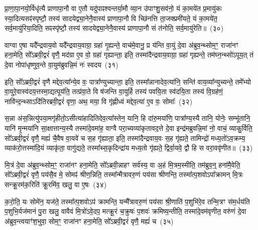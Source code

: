 प्रा॒णा॒पा॒नयो॒र्विधृ॑त्यै प्राणापा॒नौ वा ए॒तौ यदु॑पाꣴश्वन्तर्या॒मौ व्या॒न उ॑पाꣳशु॒सव॑नो॒ यं का॒मये॑त प्र॒मायु॑कः स्या॒दित्यसꣴ॑स्पृष्टौ॒ तस्य॑ सादयेद्व्या॒नेनै॒वास्य॑ प्राणापा॒नौ वि च्छि॑नत्ति ता॒जक्प्रमी॑यते॒ यं का॒मये॑त॒ सर्व॒मायु॑रिया॒दिति॒ सꣴस्पृ॑ष्टौ॒ तस्य॑ सादयेद्व्या॒नेनै॒वास्य॑ प्राणापा॒नौ सं त॑नोति॒ सर्व॒मायु॑रेति॥~(३०)

{\anuvakamend[{त॒ उ॒भया᳚न्गृह्यते॒ चतु॑श्चत्वारिꣳशच्च}]}%

वाग्वा ए॒षा यदै᳚न्द्रवाय॒वो यदै᳚न्द्रवाय॒वाग्रा॒ ग्रहा॑ गृ॒ह्यन्ते॒ वाच॑मे॒वानु॒ प्र य॑न्ति वा॒युं दे॒वा अ॑ब्रुव॒न्थ्सोम॒ꣳ॒ राजा॑नꣳ हना॒मेति॒ सो᳚\-ऽब्रवी॒द्वरं॑ वृणै॒ मद॑ग्रा ए॒व वो॒ ग्रहा॑ गृह्यान्ता॒ इति॒ तस्मा॑दैन्द्रवाय॒वाग्रा॒ ग्रहा॑ गृह्यन्ते॒ तम॑घ्न॒न्थ्सो॑\-ऽपूय॒त् तं दे॒वा नोपा॑धृष्णुव॒न्ते वा॒युम॑ब्रुवन्नि॒मं नः॑ स्वदय~(३१)

इति॒ सो᳚\-ऽब्रवी॒द्वरं॑ वृणै मद्देव॒त्या᳚न्ये॒व वः॒ पात्रा᳚ण्युच्यान्ता॒ इति॒ तस्मा᳚न्नानादेव॒त्या॑नि॒ सन्ति॑ वाय॒व्या᳚न्युच्यन्ते॒ तमे᳚भ्यो वा॒युरे॒वास्व॑दय॒त्तस्मा॒द्यत्पूय॑ति॒ तत्प्र॑वा॒ते वि ष॑जन्ति वा॒युर्\mbox{}हि तस्य॑ पवयि॒ता स्व॑दयि॒ता तस्य॑ वि॒ग्रह॑णं॒ नावि॑न्द॒न्थ्सा\-ऽदि॑तिरब्रवी॒द्वरं॑ वृणा॒ अथ॒ मया॒ वि गृ॑ह्णीध्वं मद्देव॒त्या॑ ए॒व वः॒ सोमाः᳚~(३२)

स॒न्ना अ॑स॒न्नित्यु॑पया॒मगृ॑हीतो॒\-ऽसीत्या॑हादितिदेव॒त्या᳚स्तेन॒ यानि॒ हि दा॑रु॒मया॑णि॒ पात्रा᳚ण्य॒स्यै तानि॒ योनेः॒ सम्भू॑तानि॒ यानि॑ मृ॒न्मया॑नि सा॒क्षात्तान्य॒स्यै तस्मा॑दे॒वमा॑ह॒ वाग्वै परा॒च्यव्या॑कृतावद॒त्ते दे॒वा इन्द्र॑मब्रुवन्नि॒मां नो॒ वाचं॒ व्याकु॒र्विति॒ सो᳚\-ऽब्रवी॒द्वरं॑ वृणै॒ मह्यं॑ चै॒वैष वा॒यवे॑ च स॒ह गृ॑ह्याता॒ इति॒ तस्मा॑दैन्द्रवाय॒वः स॒ह गृ॑ह्यते॒ तामिन्द्रो॑ मध्य॒तो॑\-ऽव॒क्रम्य॒ व्याक॑रो॒त्तस्मा॑दि॒यं व्याकृ॑ता॒ वागु॑द्यते॒ तस्मा᳚थ्स॒कृदिन्द्रा॑य मध्य॒तो गृ॑ह्यते॒ द्विर्वा॒यवे॒ द्वौ हि स वरा॒ववृ॑णीत॥~(३३)

{\anuvakamend[{स्व॒द॒य॒ सोमाः᳚ स॒हाष्टाविꣳ॑शतिश्च}]}%

मि॒त्रं दे॒वा अ॑ब्रुव॒न्थ्सोम॒ꣳ॒ राजा॑नꣳ हना॒मेति॒ सो᳚\-ऽब्रवी॒न्नाहꣳ सर्व॑स्य॒ वा अ॒हं मि॒त्रम॒स्मीति॒ तम॑ब्रुव॒न्॒ हना॑मै॒वेति॒ सो᳚\-ऽब्रवी॒द्वरं॑ वृणै॒ पय॑सै॒व मे॒ सोमꣴ॑ श्रीण॒न्निति॒ तस्मा᳚न्मैत्रावरु॒णं पय॑सा श्रीणन्ति॒ तस्मा᳚त्प॒शवो\-ऽपा᳚क्रामन् मि॒त्रः सन्क्रू॒रम॑क॒रिति॑ क्रू॒रमि॑व॒ खलु॒ वा ए॒षः~(३४)

क॒रो॒ति॒ यः सोमे॑न॒ यज॑ते॒ तस्मा᳚त्प॒शवो\-ऽप॑ क्रामन्ति॒ यन्मै᳚त्रावरु॒णं पय॑सा श्री॒णाति॑ प॒शुभि॑रे॒व तन्मि॒त्रꣳ स॑म॒र्धय॑ति प॒शुभि॒र्यज॑मानं पु॒रा खलु॒ वावैवं मि॒त्रो॑\-ऽवे॒दप॒ मत्क्रू॒रं च॒क्रुषः॑ प॒शवः॑ क्रमिष्य॒न्तीति॒ तस्मा॑दे॒वम॑वृणीत॒ वरु॑णं दे॒वा अ॑ब्रुव॒न्त्वयाꣳ॑श॒भुवा॒ सोम॒ꣳ॒ राजा॑नꣳ हना॒मेति॒ सो᳚\-ऽब्रवी॒द्वरं॑ वृणै॒ मह्यं॑ च~(३५)

